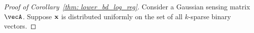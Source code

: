 \begin{proof}[Proof of Corollary~\ref{thm: lower_bd_log_reg}]
Consider a Gaussian sensing matrix $\vecA$. Suppose $\mathbf{x}$ is distributed uniformly on the set of all $k$-sparse binary vectors. 


\end{proof}
